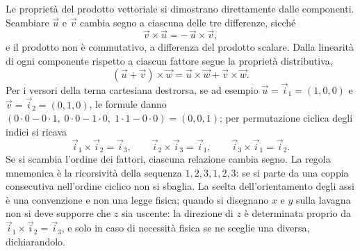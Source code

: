 \documentclass[main.tex]{subfiles}
\begin{document}
Le proprietà del prodotto vettoriale si dimostrano direttamente dalle componenti. Scambiare $\vec u$ e $\vec v$ cambia segno a ciascuna delle tre differenze, sicché
\[
\vec v\times\vec u=-\,\vec u\times\vec v ,
\]
e il prodotto non è commutativo, a differenza del prodotto scalare. Dalla linearità di ogni componente rispetto a ciascun fattore segue la proprietà distributiva,
\[
(\vec u+\vec v)\times\vec w=\vec u\times\vec w+\vec v\times\vec w .
\]
Per i versori della terna cartesiana destrorsa, se ad esempio $\vec u=\vec i_1=(1,0,0)$ e $\vec v=\vec i_2=(0,1,0)$, le formule danno $(0\cdot0-0\cdot1,\;0\cdot0-1\cdot0,\;1\cdot1-0\cdot0)=(0,0,1)$; per permutazione ciclica degli indici si ricava
\[
\vec i_1\times\vec i_2=\vec i_3,\qquad \vec i_2\times\vec i_3=\vec i_1,\qquad \vec i_3\times\vec i_1=\vec i_2 .
\]
Se si scambia l'ordine dei fattori, ciascuna relazione cambia segno. La regola mnemonica è la ricorsività della sequenza $1,2,3,1,2,3$: se si parte da una coppia consecutiva nell'ordine ciclico non si sbaglia. La scelta dell'orientamento degli assi è una convenzione e non una legge fisica; quando si disegnano $x$ e $y$ sulla lavagna non si deve supporre che $z$ sia uscente: la direzione di $z$ è determinata proprio da $\vec i_1\times\vec i_2=\vec i_3$, e solo in caso di necessità fisica se ne sceglie una diversa, dichiarandolo.
\end{document}
